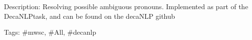 Description\+: Resolving possible ambiguous pronouns. Implemented as part of the Deca\+N\+L\+Ptask, and can be found on the deca\+N\+LP github

Tags\+: \#mwsc, \#\+All, \#decanlp 